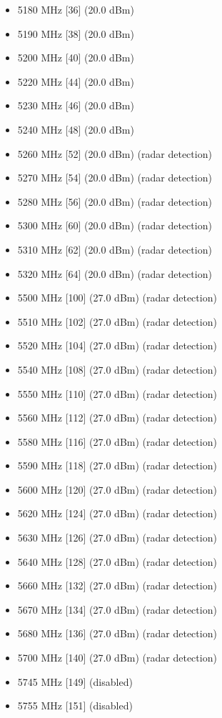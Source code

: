 \begin{itemize}
\item 5180 MHz [36] (20.0 dBm)
\item 5190 MHz [38] (20.0 dBm)
\item 5200 MHz [40] (20.0 dBm)
\item 5220 MHz [44] (20.0 dBm)
\item 5230 MHz [46] (20.0 dBm)
\item 5240 MHz [48] (20.0 dBm)
\item 5260 MHz [52] (20.0 dBm) (radar detection)
\item 5270 MHz [54] (20.0 dBm) (radar detection)
\item 5280 MHz [56] (20.0 dBm) (radar detection)
\item 5300 MHz [60] (20.0 dBm) (radar detection)
\item 5310 MHz [62] (20.0 dBm) (radar detection)
\item 5320 MHz [64] (20.0 dBm) (radar detection)
\item 5500 MHz [100] (27.0 dBm) (radar detection)
\item 5510 MHz [102] (27.0 dBm) (radar detection)
\item 5520 MHz [104] (27.0 dBm) (radar detection)
\item 5540 MHz [108] (27.0 dBm) (radar detection)
\item 5550 MHz [110] (27.0 dBm) (radar detection)
\item 5560 MHz [112] (27.0 dBm) (radar detection)
\item 5580 MHz [116] (27.0 dBm) (radar detection)
\item 5590 MHz [118] (27.0 dBm) (radar detection)
\item 5600 MHz [120] (27.0 dBm) (radar detection)
\item 5620 MHz [124] (27.0 dBm) (radar detection)
\item 5630 MHz [126] (27.0 dBm) (radar detection)
\item 5640 MHz [128] (27.0 dBm) (radar detection)
\item 5660 MHz [132] (27.0 dBm) (radar detection)
\item 5670 MHz [134] (27.0 dBm) (radar detection)
\item 5680 MHz [136] (27.0 dBm) (radar detection)
\item 5700 MHz [140] (27.0 dBm) (radar detection)
\item 5745 MHz [149] (disabled)
\item 5755 MHz [151] (disabled)

\end{itemize}
